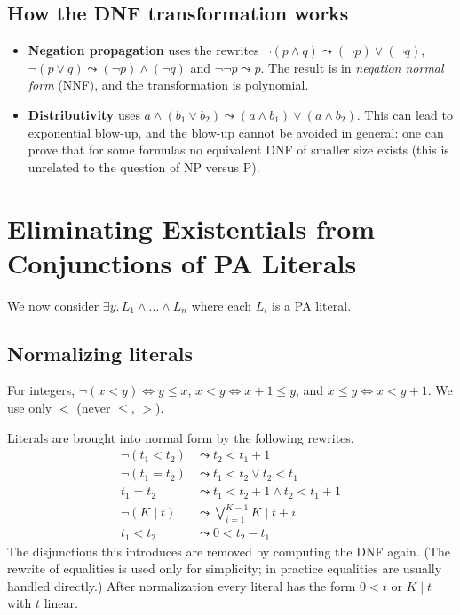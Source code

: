 \subsection*{How the DNF transformation works}
 
\begin{itemize}
  \item \textbf{Negation propagation} uses the rewrites $\neg(p \wedge q) \leadsto (\neg p) \vee (\neg q)$, $\neg(p \vee q) \leadsto (\neg p) \wedge (\neg q)$ and $\neg\neg p \leadsto p$. The result is in \emph{negation normal form} (NNF), and the transformation is polynomial.
  \item \textbf{Distributivity} uses $a \wedge (b_1 \vee b_2) \leadsto (a \wedge b_1) \vee (a \wedge b_2)$. This can lead to exponential blow-up, and the blow-up cannot be avoided in general: one can prove that for some formulas no equivalent DNF of smaller size exists (this is unrelated to the question of NP versus P).
\end{itemize}
 
\section{Eliminating Existentials from Conjunctions of PA Literals}
 
We now consider $\exists y.\, L_1 \wedge \ldots \wedge L_n$ where each $L_i$ is a PA literal.
 
\subsection{Normalizing literals}
 
For integers, $\neg(x < y) \iff y \le x$, $x < y \iff x + 1 \le y$, and $x \le y \iff x < y + 1$. We use only $<$ (never $\le$, $>$).
 
 
Literals are brought into normal form by the following rewrites.
\begin{align*}
\neg(t_1 < t_2) &\leadsto t_2 < t_1 + 1 \\
\neg(t_1 = t_2) &\leadsto t_1 < t_2 \vee t_2 < t_1 \\
t_1 = t_2 &\leadsto t_1 < t_2 + 1 \wedge t_2 < t_1 + 1 \\
\neg(K \mid t) &\leadsto \bigvee_{i=1}^{K-1} K \mid t + i \\
t_1 < t_2 &\leadsto 0 < t_2 - t_1
\end{align*}
The disjunctions this introduces are removed by computing the DNF again. (The rewrite of equalities is used only for simplicity; in practice equalities are usually handled directly.) After normalization every literal has the form $0 < t$ or $K \mid t$ with $t$ linear.
 
